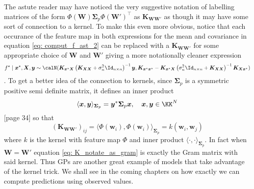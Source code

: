 The astute reader may have noticed the very suggestive notation of labelling matrices of the form $\Phi \left( \bm{W} \right) \bm{\Sigma}_p {\Phi \left( \bm{W}' \right)}^{\intercal}$ as $\bm{K}_{\bm{W} \bm{W}'}$ as though it may have some sort of connection to a kernel. To make this even more obvious, notice that each occurance of the feature map in both expressions for the mean and covariance in equation \ref{eq: comput_f_ast_2} can be replaced with a $\bm{K}_{\bm{W} \bm{W}'}$ for some appropriate choice of $\bm{W}$ and $\bm{W}'$ giving a more notationally cleaner expression
\begin{equation} \label{eq: comput_f_ast_3}
    f^{\star} \mid \bm{x}^{\star} , \bm{X} , \bm{y} \sim \calN ( \bm{K}_{\bm{x}^{\star} \bm{X}} \left( \bm{K}_{\bm{X} \bm{X}} + \sigma_n^{2} \Id_{n \times n} \right)^{-1} \bm{y} , \bm{K}_{\bm{x}^{\star} \bm{x}^{\star}} - \bm{K}_{\bm{x}^{\star} \bm{X}} \left( \sigma_n^{2} \Id_{n \times n} + \bm{K}_{\bm{X} \bm{X}} \right)^{-1} \bm{K}_{\bm{X} \bm{x}^{\star}} )
\end{equation}
. To get a better idea of the connection to kernels, since $\bm{\Sigma}_p$ is a symmetric positive semi definite matrix, it defines an inner product
\[
    \langle \bm{x} , \bm{y} \rangle_{\bm{\Sigma}_p} = \bm{y}^{\ast} \bm{\Sigma}_p \bm{x}, \quad \bm{x} , \bm{y} \in \KK^{N}
\]
\cite{WangGuorongGITa}[page 34] so that
\begin{equation} \label{eq: K_notate_as_gram}
    \left( \bm{K}_{\bm{W} \bm{W}'} \right)_{ij} = \langle \Phi \left( \bm{w}_i \right) ,\Phi \left( \bm{w}_i \right) \rangle_{\bm{\Sigma}_p} = k \left( \bm{w}_i , \bm{w}_j \right)
\end{equation}
where $k$ is the kernel with feature map $\Phi$ and inner product $\langle \cdot , \cdot \rangle_{\bm{\Sigma}_p}$. In fact when $\bm{W} = \bm{W}'$ equation \ref{eq: K_notate_as_gram} is exactly the Gram matrix with said kernel. Thus GPs are another great example of models that take advantage of the kernel trick. We shall see in the coming chapters on how exactly we can compute predictions using observed values.
